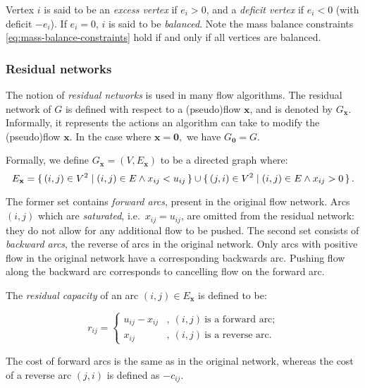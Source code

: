 Vertex $i$ is said to be an \emph{excess vertex} if $e_{i}>0$, and a \emph{deficit vertex} if $e_{i}<0$ (with deficit $-e_{i}$). If $e_{i}=0$, $i$ is said to be \emph{balanced}. Note the mass balance constraints \cref{eq:mass-balance-constraints} hold if and only if all vertices are balanced.

\subsubsection{Residual networks}


The notion of \emph{residual networks} is used in many flow algorithms. The residual network of $G$ is defined with respect to a (pseudo)flow $\mathbf{x}$, and is denoted by $G_{\mathbf{x}}$. Informally, it represents the actions an algorithm can take to modify the (pseudo)flow $\mathbf{x}$. In the case where $\mathbf{x=0},$ we have $G_{\mathbf{0}}=G$.

Formally, we define $G_{\mathbf{x}}=\left(V,E_{\mathbf{x}}\right)$ to be a directed graph where:
\begin{equation}
E_{\mathbf{x}}=\set{(i,j)\in V^{2} | (i,j)\in E\land x_{ij}<u_{ij}} \cup \set{(j,i)\in V^{2} | (i,j)\in E\land x_{ij}>0}. 
\end{equation}

The former set contains \emph{forward arcs}, present in the original flow network. Arcs $(i,j)$ which are \emph{saturated}, i.e.\ $x_{ij}=u_{ij}$, are omitted from the residual network: they do not allow for any additional flow to be pushed. The second set consists of \emph{backward arcs}, the reverse of arcs in the original network. Only arcs with positive flow in the original network have a corresponding backwards arc. Pushing flow along the backward arc corresponds to cancelling flow on the forward arc.

The \emph{residual capacity} of an arc $(i,j)\in E_{\mathbf{x}}$ is defined to be:

\begin{equation}
r_{ij}=\begin{cases}
u_{ij}-x_{ij} & ,\:(i,j)\:\mbox{is a forward arc;}\\
x_{ij} & ,\:(i,j)\:\mbox{is a reverse arc.}
\end{cases}
\end{equation}

The cost of forward arcs is the same as in the original network, whereas the cost of a reverse arc $(j,i)$ is defined as $-c_{ij}$.

